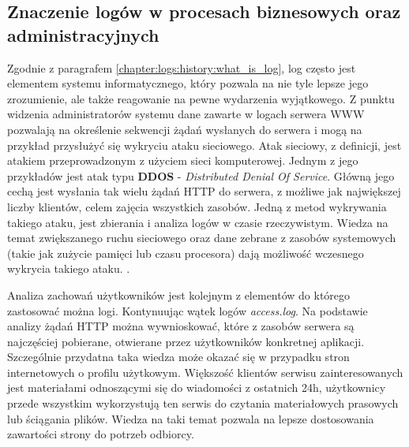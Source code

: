     \subsection{Znaczenie logów w procesach biznesowych oraz administracyjnych}
    Zgodnie z paragrafem \ref{chapter:logs:history:what_is_log}, log często jest elementem systemu informatycznego, 
    który pozwala na nie tyle lepsze jego zrozumienie, ale także reagowanie na pewne wydarzenia wyjątkowego.
    Z punktu widzenia administratorów systemu dane zawarte w logach serwera WWW pozwalają na określenie 
    sekwencji żądań wysłanych do serwera i mogą na przykład przysłużyć się wykryciu ataku sieciowego.
    Atak sieciowy, z definicji, jest atakiem przeprowadzonym z użyciem sieci komputerowej.
    Jednym z jego przykładów jest atak typu \textbf{DDOS} - \textit{Distributed Denial Of Service}. 
    Główną jego cechą jest wysłania tak wielu żądań HTTP do serwera, z możliwe jak największej liczby klientów,
    celem zajęcia wszystkich zasobów. Jedną z metod wykrywania takiego ataku, jest zbierania i analiza logów
    w czasie rzeczywistym. Wiedza na temat zwiększanego ruchu sieciowego oraz dane zebrane z zasobów systemowych (takie jak zużycie pamięci lub czasu procesora)
    dają możliwość wczesnego wykrycia takiego ataku. \cite{web_based_attacks}.
    
    
    Analiza zachowań użytkowników jest kolejnym z elementów do którego zastosować można logi.
    Kontynuując wątek logów \textit{access.log}. Na podstawie analizy żądań HTTP można wywnioskować, które z zasobów 
    serwera są najczęściej pobierane, otwierane przez użytkowników konkretnej aplikacji. Szczególnie
    przydatna taka wiedza może okazać się w przypadku stron internetowych o profilu użytkowym.
    Większość klientów serwisu zainteresowanych jest materiałami odnoszącymi się do wiadomości z ostatnich 24h,
    użytkownicy przede wszystkim wykorzystują ten serwis do czytania materiałowych prasowych lub ściągania plików.
    Wiedza na taki temat pozwala na lepsze dostosowania zawartości strony do potrzeb odbiorcy.
    